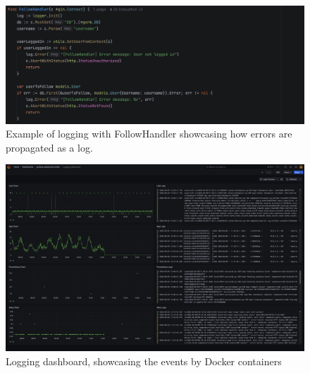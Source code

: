 \begin{figure} [H]
    \centering
    \includegraphics[width=1\linewidth]{images/StdLog.png}
    \caption{Example of logging with FollowHandler showcasing how errors are propagated as a log.}
    \label{fig:enter-label}
\end{figure}
\begin{figure} [H]
    \centering
    \includegraphics[width=1\linewidth]{images/logging.png}
    \caption{Logging dashboard, showcasing the events by Docker containers}
    \label{fig:logging}
\end{figure}

